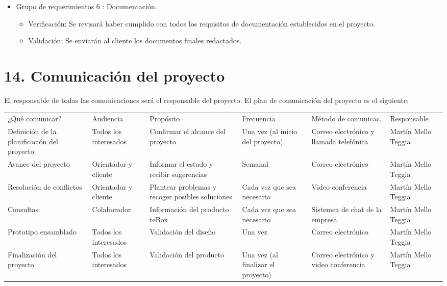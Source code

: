 \documentclass[11pt]{charter}
\begin{document}
\begin{itemize}
\item Grupo de requerimientos 6 : Documentación.
\begin{itemize}
\item Verificación: Se revisará haber cumplido con todos los requisitos de documentación establecidos en el proyecto.
\item Validación: Se enviarán al cliente los documentos finales redactados.
\end{itemize}
\end{itemize}


\section{14. Comunicación del proyecto}
\label{sec:comunicaciones}

El responsable de todas las comunicaciones será el responsable del proyecto. El plan de comunicación del proyecto es el siguiente:

\begin{table}[htpb]
\centering
\begin{tabularx}{\linewidth}{@{}|X|C{2.4cm}|C{3cm}|C{1.8cm}|C{2cm}|C{2.1cm}|@{}}
\hline
{} 
           \\ \hline
{} 
¿Qué comunicar? & Audiencia & Propósito & Frecuencia & Método de comunicac. & Responsable \\ \hline 
Definición de la planificación del proyecto & Todos los interesados & Confirmar el alcance del proyecto & Una vez (al inicio del proyecto) & Correo electrónico y llamada telefónica & Martín Mello Teggia \\ \hline
Avance del proyecto & Orientador y cliente & Informar el estado y recibir sugerencias & Semanal & Correo electrónico & Martín Mello Teggia \\ \hline
Resolución de conflictos & Orientador y cliente & Plantear problemas y recoger posibles soluciones & Cada vez que sea necesario & Video conferencia & Martín Mello Teggia \\ \hline
Consultas & Colaborador & Información del producto teBox & Cada vez que sea necesario & Sistemea de chat de la empresa & Martín Mello Teggia \\ \hline
Prototipo ensamblado & Todos los interesados & Validación del diseño & Una vez & Correo electrónico & Martín Mello Teggia \\ \hline
Finalización del proyecto & Todos los interesados & Validación del producto & Una vez (al finalizar el proyecto) & Correo electrónico y video conferencia & Martín Mello Teggia \\ \hline
\end{tabularx}
\end{table}
\end{document}
